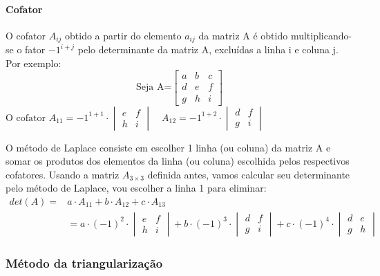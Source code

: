    \paragraph*{Cofator} O cofator $A_{ij}$ obtido a partir do elemento $a_{ij}$ da matriz A é obtido multiplicando-se o fator $-1^{i+j}$ pelo determinante da matriz A, excluídas a linha i e coluna j. Por exemplo:
\begin{displaymath}
    \text{Seja A=}\begin{bmatrix}
     a & b & c\\d & e & f\\g & h & i
   \end{bmatrix}
\end{displaymath}
   $\text{O cofator }A_{11}=-1^{1+1}\cdot \begin{vmatrix}
     e & f\\h & i
   \end{vmatrix}\quad A_{12}=-1^{1+2}\cdot \begin{vmatrix}
     d & f\\g & i
   \end{vmatrix}$
   
   O método de Laplace consiste em escolher 1 linha (ou coluna) da matriz A e somar os produtos dos elementos da linha (ou coluna) escolhida pelos respectivos cofatores. Usando a matriz $A_{3\times 3}$ definida antes, vamos calcular seu determinante pelo método de Laplace, vou escolher a linha 1 para eliminar:
   \begin{align*}
     det(A)=&a\cdot A_{11}+b\cdot A_{12}+c\cdot A_{13}\\
     &= a\cdot (-1)^2\cdot \begin{vmatrix} e & f\\h & i\end{vmatrix}+b\cdot(-1)^{3}\cdot
      \begin{vmatrix}d & f\\g & i\end{vmatrix}+  c\cdot (-1)^4\cdot \begin{vmatrix}d & e\\g & h\end{vmatrix}
   \end{align*}
   \subsubsection*{Método da triangularização}
	
